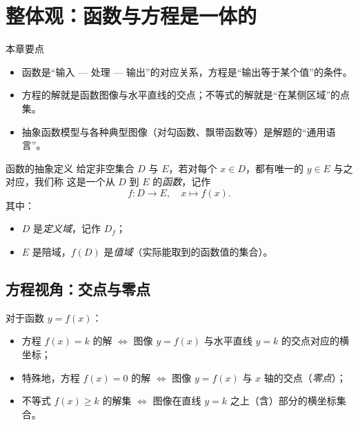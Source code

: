 \documentclass[a4paper,11pt]{ctexart}
\begin{document}
\maketitle
\tableofcontents

\section{整体观：函数与方程是一体的}

\begin{summarybox}[mathnote coverage=line]{本章要点}
  \begin{itemize}
    \item 函数是“输入 — 处理 — 输出”的对应关系，方程是“输出等于某个值”的条件。
    \item 方程的解就是函数图像与水平直线的交点；不等式的解就是“在某侧区域”的点集。
    \item 抽象函数模型与各种典型图像（对勾函数、飘带函数等）是解题的“通用语言”。
  \end{itemize}
\end{summarybox}

\begin{definitionbox}{函数的抽象定义}
  给定非空集合 $D$ 与 $E$，若对每个 $x\in D$，都有唯一的 $y\in E$ 与之对应，我们称
  这是一个从 $D$ 到 $E$ 的\emph{函数}，记作
  \[
    f\colon D\to E,\quad x\mapsto f(x).
  \]
  其中：
  \begin{itemize}
    \item $D$ 是\emph{定义域}，记作 $D_f$；
    \item $E$ 是陪域，$f(D)$ 是\emph{值域}（实际能取到的函数值的集合）。
  \end{itemize}
\end{definitionbox}

\subsection{方程视角：交点与零点}

对于函数 $y=f(x)$：

\begin{itemize}
  \item 方程 $f(x)=k$ 的解 $\Leftrightarrow$ 图像 $y=f(x)$ 与水平直线 $y=k$ 的交点对应的横坐标；
  \item 特殊地，方程 $f(x)=0$ 的解 $\Leftrightarrow$ 图像 $y=f(x)$ 与 $x$ 轴的交点（\emph{零点}）；
  \item 不等式 $f(x)\ge k$ 的解集 $\Leftrightarrow$ 图像在直线 $y=k$ 之上（含）部分的横坐标集合。
\end{itemize}
\end{document}
